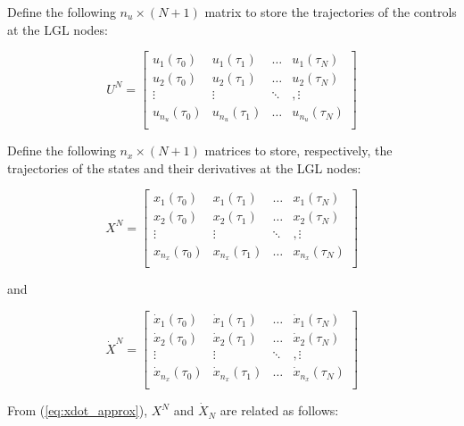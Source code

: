 \documentclass[a4paper,11pt]{report}    %
\begin{document}
Define the following $n_u \times (N+1)$ matrix  to store the trajectories of
the controls at the LGL nodes:

\begin{equation}
   U^N = \begin{bmatrix} 
           u_1(\tau_0)& u_1(\tau_1)& \ldots& u_{1}(\tau_N) \\
           u_2(\tau_0)& u_2(\tau_1)& \ldots& u_{2}(\tau_N) \\
           \vdots &   \vdots &  \ddots&, \vdots \\
           u_{n_u}(\tau_0)& u_{n_u}(\tau_1)& \ldots& u_{n_u}(\tau_N) \\
         \end{bmatrix}
\end{equation}


Define the following $n_x \times (N+1) $ matrices to store, respectively, the trajectories of
the states and their derivatives at the LGL nodes:

\begin{equation}
   X^N = \begin{bmatrix} 
           x_1(\tau_0)& x_1(\tau_1)& \ldots& x_{1}(\tau_N) \\
           x_2(\tau_0)& x_2(\tau_1)& \ldots& x_{2}(\tau_N) \\
           \vdots &   \vdots &  \ddots&, \vdots \\
           x_{n_x}(\tau_0)& x_{n_x}(\tau_1)& \ldots& x_{n_x}(\tau_N) \\
         \end{bmatrix}
\end{equation}

and

\begin{equation}
   \dot X^N = \begin{bmatrix} 
          \dot x_1(\tau_0)& \dot x_1(\tau_1)& \ldots& \dot x_{1}(\tau_N) \\
          \dot  x_2(\tau_0)& \dot  x_2(\tau_1)& \ldots&\dot  x_{2}(\tau_N) \\
           \vdots &   \vdots &  \ddots&, \vdots \\
          \dot  x_{n_x}(\tau_0)& \dot x_{n_x}(\tau_1)& \ldots& \dot x_{n_x}(\tau_N) \\
         \end{bmatrix}
\end{equation}


From (\ref{eq:xdot_approx}), $X^N$ and $\dot X_N$ are related as follows:
\end{document}
